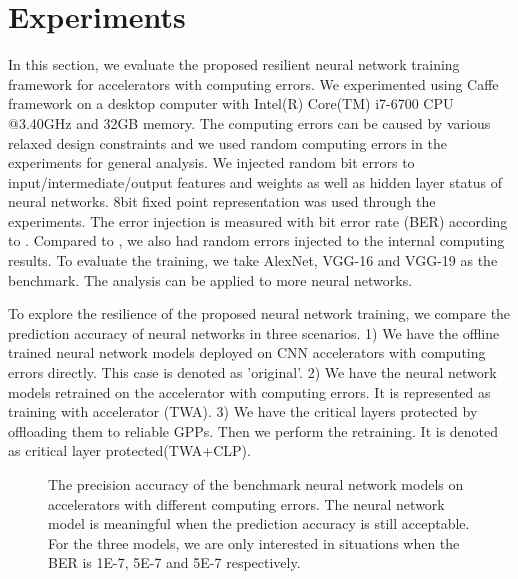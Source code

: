 \section{Experiments} \label{sec:casestudy}
In this section, we evaluate the proposed resilient neural network training 
framework for accelerators with computing errors. 
We experimented using Caffe framework on a desktop computer 
with Intel(R) Core(TM) i7-6700 CPU @3.40GHz and 32GB memory.
The computing errors can be caused by various relaxed design 
constraints and we used random computing 
errors in the experiments for general analysis.
We injected random bit errors to input/intermediate/output features and weights as well as 
hidden layer status of neural networks. 8bit fixed point representation was used
through the experiments. The error injection is measured with 
bit error rate (BER) according to \cite{B2018ARES}. Compared to \cite{B2018ARES},
we also had random errors injected to the internal computing results. 
To evaluate the training, we take AlexNet, VGG-16 and VGG-19 as the benchmark. 
The analysis can be applied to more neural networks.

To explore the resilience of the proposed neural network training, we
compare the prediction accuracy of neural networks in three scenarios.
1) We have the offline trained neural network models deployed on 
CNN accelerators with computing errors directly. This case is denoted 
as 'original'. 2) We have the neural network models retrained on the 
accelerator with computing errors. It is represented as training with 
accelerator (TWA). 3) We have the critical layers 
protected by offloading them to reliable GPPs. Then we 
perform the retraining. It is denoted as critical layer protected(TWA+CLP).

\begin{figure}[t]
        \center
        \qquad
        \qquad
        \caption{The precision accuracy of the benchmark neural network models on accelerators with different computing errors. 
		The neural network model is meaningful when the prediction accuracy is still acceptable. For the three models, 
	we are only interested in situations when the BER is 1E-7, 5E-7 and 5E-7 respectively.}
        \label{fig:softerror-accuracy}
       \vspace{-1em}
\end{figure}

